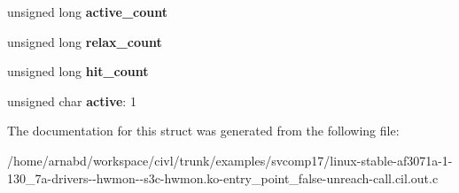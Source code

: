 \begin{DoxyCompactItemize}
\item 
\hypertarget{structwakeup__source_a82fa200f1bda95d43026697925867e3e}{}unsigned long {\bfseries active\+\_\+count}\label{structwakeup__source_a82fa200f1bda95d43026697925867e3e}

\item 
\hypertarget{structwakeup__source_a0403de455028e0d6c41d95102ad5bc8c}{}unsigned long {\bfseries relax\+\_\+count}\label{structwakeup__source_a0403de455028e0d6c41d95102ad5bc8c}

\item 
\hypertarget{structwakeup__source_a80d82346859f48aaaced9a56c1f7b99b}{}unsigned long {\bfseries hit\+\_\+count}\label{structwakeup__source_a80d82346859f48aaaced9a56c1f7b99b}

\item 
\hypertarget{structwakeup__source_afe06b18063fe337851f3604ed2580f78}{}unsigned char {\bfseries active}\+: 1\label{structwakeup__source_afe06b18063fe337851f3604ed2580f78}

\end{DoxyCompactItemize}


The documentation for this struct was generated from the following file\+:\begin{DoxyCompactItemize}
\item 
/home/arnabd/workspace/civl/trunk/examples/svcomp17/linux-\/stable-\/af3071a-\/1-\/130\+\_\+7a-\/drivers-\/-\/hwmon-\/-\/s3c-\/hwmon.\+ko-\/entry\+\_\+point\+\_\+false-\/unreach-\/call.\+cil.\+out.\+c\end{DoxyCompactItemize}
